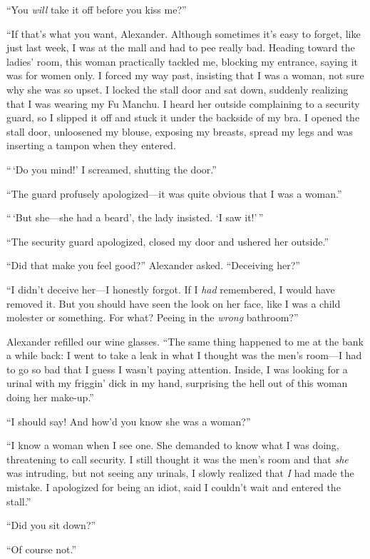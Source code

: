 ``You \emph{will} take it off before you kiss me?''

``If that's what you want, Alexander. Although sometimes it's easy to
forget, like just last week, I was at the mall and had to pee really
bad. Heading toward the ladies' room, this woman practically tackled me,
blocking my entrance, saying it was for women only. I forced my way
past, insisting that I was a woman, not sure why she was so upset. I
locked the stall door and sat down, suddenly realizing that I was
wearing my Fu Manchu. I heard her outside complaining to a security
guard, so I slipped it off and stuck it under the backside of my bra. I
opened the stall door, unloosened my blouse, exposing my breasts, spread
my legs and was inserting a tampon when they entered.

``\,`Do you mind!' I screamed, shutting the door.''

``The guard profusely apologized---it was quite obvious that I was a
woman.''

``\,`But she---she had a beard', the lady insisted. `I saw it!'\,''

``The security guard apologized, closed my door and ushered her
outside.''

``Did that make you feel good?'' Alexander asked. ``Deceiving her?''

``I didn't deceive her---I honestly forgot. If I \emph{had} remembered,
I would have removed it. But you should have seen the look on her face,
like I was a child molester or something. For what? Peeing in the
\emph{wrong} bathroom?''

Alexander refilled our wine glasses. ``The same thing happened to me at
the bank a while back: I went to take a leak in what I thought was the
men's room---I had to go so bad that I guess I wasn't paying attention.
Inside, I was looking for a urinal with my friggin' dick in my hand,
surprising the hell out of this woman doing her make-up.''

``I should say! And how'd you know she was a woman?''

``I know a woman when I see one. She demanded to know what I was doing,
threatening to call security. I still thought it was the men's room and
that \emph{she} was intruding, but not seeing any urinals, I slowly
realized that \emph{I} had made the mistake. I apologized for being an
idiot, said I couldn't wait and entered the stall.''

``Did you sit down?''

``Of course not.''

